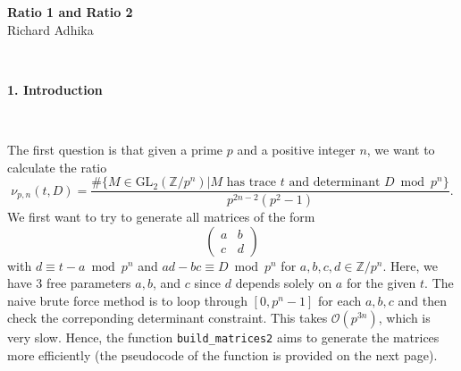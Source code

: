 \documentclass[letterpaper,12pt]{article}
\newcommand{\Z}{\mathbb{Z}}
\newcommand{\bigO}{\mathcal{O}}
\begin{document}

\begin{center}
    {\LARGE \textbf{Ratio 1 and Ratio 2}} \\
    Richard Adhika
\end{center}

\

{\bf \LARGE 1. Introduction}

\

The first question is that
given a prime $p$ and a positive integer $n$, 
we want to calculate the ratio 
\[
\nu_{p,n}(t, D) = \frac{\#\{M \in \text{GL}_2(\Z/p^n)| M \text{ has trace } t \text{ and determinant } D \bmod p^n\}}
{p^{2n-2}(p^2-1)}.
\]
We first want to try to generate all matrices of the form 
\[
\begin{pmatrix}
a & b \\ c & d
\end{pmatrix}
\]
with $d \equiv t - a \bmod p^n$ and $ad - bc \equiv D \bmod p^n$ 
for $a,b,c,d \in \Z/p^n$.
Here, we have 3 free parameters $a,b$, and $c$ since $d$ depends solely on $a$ for the given $t$.
The naive brute force method is to loop
through $[0, p^n-1]$ for each $a,b,c$ and then check the correponding determinant constraint.
This takes $\bigO(p^{3n})$, which is very slow.
Hence, the function \texttt{build\_matrices2} aims to 
generate the matrices more efficiently 
(the pseudocode of the function is provided on the next page).

\
\end{document}

